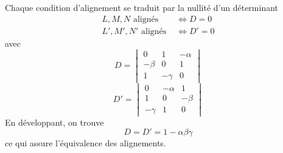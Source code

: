 \begin{enumerate}
Chaque condition d'alignement se traduit par la nullité d'un déterminant
\begin{align*}
  L, M, N \text{ alignés } &\Leftrightarrow D = 0 \\
  L', M', N' \text{ alignés } &\Leftrightarrow  D' = 0
\end{align*}
avec
\begin{displaymath}
  D = 
\begin{vmatrix}
  0      & 1       & - \alpha \\
  -\beta & 0       & 1 \\
  1      & -\gamma & 0
\end{vmatrix}
\end{displaymath}
\begin{displaymath}
  D' = 
\begin{vmatrix}
  0       & - \alpha & 1  \\
  1       & 0       & -\beta \\
  -\gamma & 1 & 0
\end{vmatrix}
\end{displaymath}
En développant, on trouve 
\begin{displaymath}
  D = D' = 1 - \alpha \beta \gamma
\end{displaymath}
ce qui assure l'équivalence des alignements.
\end{enumerate}
